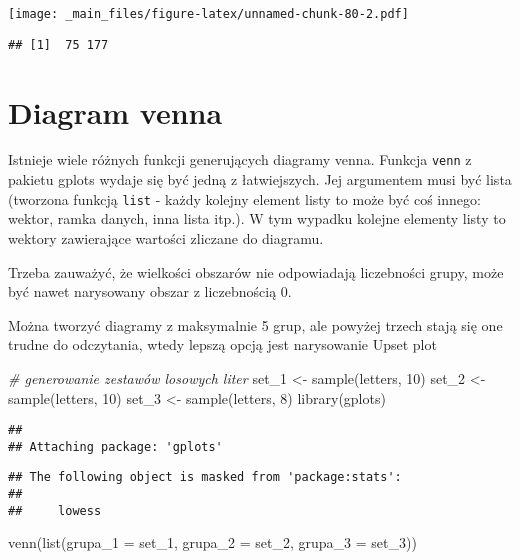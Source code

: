 \documentclass[
]{book}
\newenvironment{Shaded}{\begin{snugshade}}{\end{snugshade}}
\newcommand{\AttributeTok}[1]{\textcolor[rgb]{0.77,0.63,0.00}{#1}}
\newcommand{\CommentTok}[1]{\textcolor[rgb]{0.56,0.35,0.01}{\textit{#1}}}
\newcommand{\DecValTok}[1]{\textcolor[rgb]{0.00,0.00,0.81}{#1}}
\newcommand{\FunctionTok}[1]{\textcolor[rgb]{0.00,0.00,0.00}{#1}}
\newcommand{\NormalTok}[1]{#1}
\newcommand{\OtherTok}[1]{\textcolor[rgb]{0.56,0.35,0.01}{#1}}
\begin{document}
\texttt{[image: \_main\_files/figure-latex/unnamed-chunk-80-2.pdf]}

\begin{verbatim}
## [1]  75 177
\end{verbatim}

\hypertarget{diagram-venna}{%
\section{Diagram venna}\label{diagram-venna}}

Istnieje wiele różnych funkcji generujących diagramy venna. Funkcja \texttt{venn} z pakietu gplots wydaje się być jedną z łatwiejszych. Jej argumentem musi być lista (tworzona funkcją \texttt{list} - każdy kolejny element listy to może być coś innego: wektor, ramka danych, inna lista itp.). W tym wypadku kolejne elementy listy to wektory zawierające wartości zliczane do diagramu.

Trzeba zauważyć, że wielkości obszarów nie odpowiadają liczebności grupy, może być nawet narysowany obszar z liczebnością 0.

Można tworzyć diagramy z maksymalnie 5 grup, ale powyżej trzech stają się one trudne do odczytania, wtedy lepszą opcją jest narysowanie Upset plot

\begin{Shaded}
\begin{Highlighting}[]
\CommentTok{\# generowanie zestawów losowych liter}
\NormalTok{set\_1 }\OtherTok{\textless{}{-}} \FunctionTok{sample}\NormalTok{(letters, }\DecValTok{10}\NormalTok{)}
\NormalTok{set\_2 }\OtherTok{\textless{}{-}} \FunctionTok{sample}\NormalTok{(letters, }\DecValTok{10}\NormalTok{)}
\NormalTok{set\_3 }\OtherTok{\textless{}{-}} \FunctionTok{sample}\NormalTok{(letters, }\DecValTok{8}\NormalTok{)}
\FunctionTok{library}\NormalTok{(gplots)}
\end{Highlighting}
\end{Shaded}

\begin{verbatim}
## 
## Attaching package: 'gplots'
\end{verbatim}

\begin{verbatim}
## The following object is masked from 'package:stats':
## 
##     lowess
\end{verbatim}

\begin{Shaded}
\begin{Highlighting}[]
\FunctionTok{venn}\NormalTok{(}\FunctionTok{list}\NormalTok{(}\AttributeTok{grupa\_1 =}\NormalTok{ set\_1, }\AttributeTok{grupa\_2 =}\NormalTok{ set\_2, }\AttributeTok{grupa\_3 =}\NormalTok{ set\_3))}
\end{Highlighting}
\end{Shaded}
\end{document}
